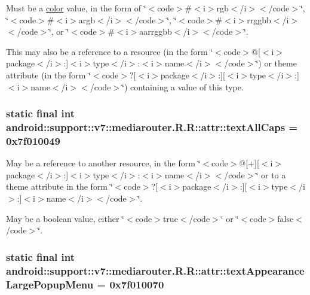 Must be a \hyperlink{classandroid_1_1support_1_1v7_1_1mediarouter_1_1_r_1_1color}{color} value, in the form of \char`\"{}$<$code$>$\#$<$i$>$rgb$<$/i$>$$<$/code$>$\char`\"{}, \char`\"{}$<$code$>$\#$<$i$>$argb$<$/i$>$$<$/code$>$\char`\"{}, \char`\"{}$<$code$>$\#$<$i$>$rrggbb$<$/i$>$$<$/code$>$\char`\"{}, or \char`\"{}$<$code$>$\#$<$i$>$aarrggbb$<$/i$>$$<$/code$>$\char`\"{}. 

This may also be a reference to a resource (in the form \char`\"{}$<$code$>$@\mbox{[}$<$i$>$package$<$/i$>$:\mbox{]}$<$i$>$type$<$/i$>$:$<$i$>$name$<$/i$>$$<$/code$>$\char`\"{}) or theme attribute (in the form \char`\"{}$<$code$>$?\mbox{[}$<$i$>$package$<$/i$>$:\mbox{]}\mbox{[}$<$i$>$type$<$/i$>$:\mbox{]}$<$i$>$name$<$/i$>$$<$/code$>$\char`\"{}) containing a value of this type. \hypertarget{classandroid_1_1support_1_1v7_1_1mediarouter_1_1_r_1_1attr_1fc12be4b736e8d39042b8cde0d601c0}{
\subsubsection[{textAllCaps}]{\setlength{\rightskip}{0pt plus 5cm}static final int android::support::v7::mediarouter.R.R::attr::textAllCaps = 0x7f010049}}
\label{classandroid_1_1support_1_1v7_1_1mediarouter_1_1_r_1_1attr_1fc12be4b736e8d39042b8cde0d601c0}


May be a reference to another resource, in the form \char`\"{}$<$code$>$@\mbox{[}+\mbox{]}\mbox{[}$<$i$>$package$<$/i$>$:\mbox{]}$<$i$>$type$<$/i$>$:$<$i$>$name$<$/i$>$$<$/code$>$\char`\"{} or to a theme attribute in the form \char`\"{}$<$code$>$?\mbox{[}$<$i$>$package$<$/i$>$:\mbox{]}\mbox{[}$<$i$>$type$<$/i$>$:\mbox{]}$<$i$>$name$<$/i$>$$<$/code$>$\char`\"{}. 

May be a boolean value, either \char`\"{}$<$code$>$true$<$/code$>$\char`\"{} or \char`\"{}$<$code$>$false$<$/code$>$\char`\"{}. \hypertarget{classandroid_1_1support_1_1v7_1_1mediarouter_1_1_r_1_1attr_ae857c869c80535ba09b3b86d905e93b}{
\subsubsection[{textAppearanceLargePopupMenu}]{\setlength{\rightskip}{0pt plus 5cm}static final int android::support::v7::mediarouter.R.R::attr::textAppearanceLargePopupMenu = 0x7f010070}}
\label{classandroid_1_1support_1_1v7_1_1mediarouter_1_1_r_1_1attr_ae857c869c80535ba09b3b86d905e93b}


